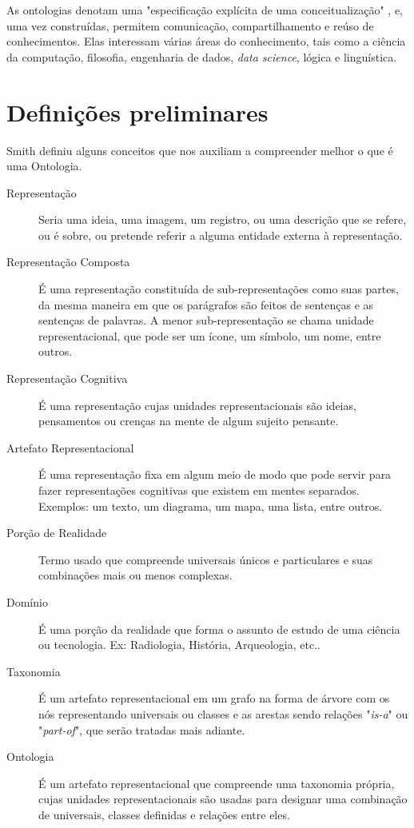 As ontologias denotam uma "especificação explícita de uma conceitualização" \cite{ontoGruber}, e, uma vez construídas, permitem comunicação, compartilhamento e reúso de conhecimentos. Elas interessam várias áreas do conhecimento, tais como a ciência da computação, filosofia, engenharia de dados, \textit{data science}, lógica e linguística.

\section{Definições preliminares}

Smith \cite{ontoSmith} definiu alguns conceitos que nos auxiliam a compreender melhor o que é uma Ontologia.

\begin{description}
	\item[Representação] Seria uma ideia, uma imagem, um registro, ou uma descrição que se refere, ou é sobre, ou pretende referir a alguma entidade externa à representação.
	\item[Representação Composta] É uma representação constituída de sub-representações como suas partes, da mesma maneira em que os parágrafos são feitos de sentenças e as sentenças de palavras. A menor sub-representação se chama unidade representacional, que pode ser um ícone, um símbolo, um nome, entre outros.
	\item[Representação Cognitiva] É uma representação cujas unidades representacionais são ideias, pensamentos ou crenças na mente de algum sujeito pensante.
	\item[Artefato Representacional] É uma representação fixa em algum meio de modo que pode servir para fazer representações cognitivas que existem em mentes separados. Exemplos: um texto, um diagrama, um mapa, uma lista, entre outros.
	\item[Porção de Realidade] Termo usado que compreende universais únicos e particulares e suas combinações mais ou menos complexas.
	\item[Domínio] É uma porção da realidade que forma o assunto de estudo de uma ciência ou tecnologia. Ex: Radiologia, História, Arqueologia, etc..
	\item[Taxonomia] É um artefato representacional em um grafo na forma de árvore com os nós representando universais ou classes e as arestas sendo relações "\textit{is-a}" ou "\textit{part-of}", que serão tratadas mais adiante.
	\item[Ontologia] É um artefato representacional que compreende uma taxonomia própria, cujas unidades representacionais são usadas para designar uma combinação de universais, classes definidas e relações entre eles.
\end{description} 

